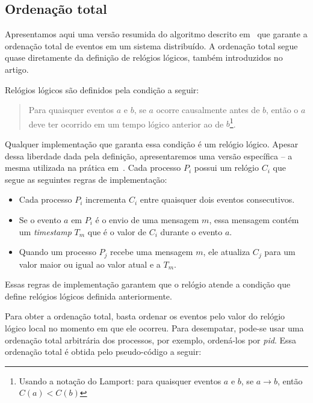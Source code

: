 \subsection{Ordenação total}

Apresentamos aqui uma versão resumida do algoritmo descrito
em~\cite{lamport78} que garante a ordenação total de eventos em um
sistema distribuído. A ordenação total segue quase diretamente da
definição de relógios lógicos, também introduzidos no artigo.

Relógios lógicos são definidos pela condição a seguir:
\begin{quote}
  Para quaisquer eventos $a$ e $b$, se $a$ ocorre causalmente antes de
  $b$, então o $a$ deve ter ocorrido em um tempo lógico anterior ao de
  $b$\footnote{Usando a notação do Lamport: para quaisquer eventos $a$
    e $b$, se $a \rightarrow b$, então $C(a) < C(b)$}.
\end{quote}
\noindent Qualquer implementação que garanta essa condição é um
relógio lógico. Apesar dessa liberdade dada pela definição,
apresentaremos uma versão específica -- a mesma utilizada na prática
em~\cite{lamport78}. Cada processo $P_i$ possui um relógio $C_i$ que
segue as seguintes regras de implementação:
\begin{itemize}
\item Cada processo $P_i$ incrementa $C_i$ entre quaisquer dois eventos
      consecutivos.
\item Se o evento $a$ em $P_i$ é o envio de uma mensagem $m$, essa
      mensagem contém um \emph{timestamp} $T_m$ que é o valor de $C_i$
      durante o evento $a$.
\item Quando um processo $P_j$ recebe uma mensagem $m$, ele atualiza
      $C_j$ para um valor maior ou igual ao valor atual e a $T_m$.
\end{itemize}

Essas regras de implementação garantem que o relógio atende a condição
que define relógios lógicos definida anteriormente.

Para obter a ordenação total, basta ordenar os eventos pelo valor do
relógio lógico local no momento em que ele ocorreu. Para desempatar,
pode-se usar uma ordenação total arbitrária dos processos, por
exemplo, ordená-los por \emph{pid}. Essa ordenação total é obtida pelo
pseudo-código a seguir:


